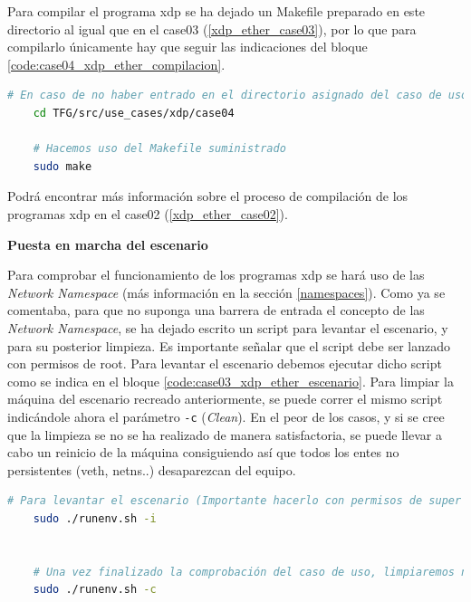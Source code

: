 Para compilar el programa \gls{xdp} se ha dejado un Makefile preparado en este directorio al igual que en el case03 (\ref{xdp_ether_case03}), por lo que para compilarlo únicamente hay que seguir las indicaciones del bloque \ref{code:case04_xdp_ether_compilacion}.

\begin{lstlisting}[language= bash, style=Consola, caption={Compilación programa XDP - Case04},label=code:case04_xdp_ether_compilacion]
    # En caso de no haber entrado en el directorio asignado del caso de uso
    cd TFG/src/use_cases/xdp/case04
    
    # Hacemos uso del Makefile suministrado 
    sudo make
\end{lstlisting}
\vspace{0.5cm}

Podrá encontrar más información sobre el proceso de compilación de los programas \gls{xdp} en el case02 (\ref{xdp_ether_case02}).


\vspace{0.7cm}
\textbf{Puesta en marcha del escenario}\\
\par
Para comprobar el funcionamiento de los programas \gls{xdp} se hará uso de las \textit{Network Namespace} (más información en la sección \ref{namespaces}). Como ya se comentaba, para que no suponga una barrera de entrada el concepto de las \textit{Network Namespace}, se ha dejado escrito un script para levantar el escenario, y para su posterior limpieza. Es importante señalar que el script debe ser lanzado con permisos de root. Para levantar el escenario debemos ejecutar dicho script como se indica en el bloque \ref{code:case03_xdp_ether_escenario}. Para limpiar la máquina del escenario recreado anteriormente, se puede correr el mismo script indicándole ahora el parámetro \texttt{-c} (\textit{Clean}). En el peor de los casos, y si se cree que la limpieza se no se ha realizado de manera satisfactoria, se puede llevar a cabo un reinicio de la máquina consiguiendo así que todos los entes no persistentes (\gls{veth}, netns..) desaparezcan del equipo.

\begin{lstlisting}[language= bash, style=Consola, caption={Puesta en marcha del escenario - Case04},label=code:case04_xdp_ether_escenario]
    # Para levantar el escenario (Importante hacerlo con permisos de super usuario)
    sudo ./runenv.sh -i
    
    
    # Una vez finalizado la comprobación del caso de uso, limpiaremos nuestra maquina:
    sudo ./runenv.sh -c
\end{lstlisting}
\vspace{0.5cm}

